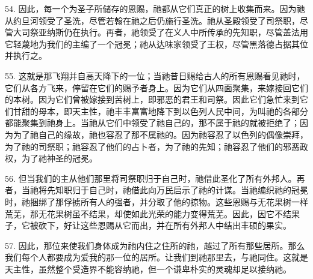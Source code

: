 54. 因此，每一个为圣子所储存的恩赐，祂都从它们真正的树上收集而来。因为祂从约旦河领受了圣洗，尽管若翰在祂之后仍施行圣洗。祂从圣殿领受了司祭职，尽管大司祭亚纳斯仍在执行。再者，祂领受了在义人中所传承的先知职，尽管盖法用它轻蔑地为我们的主编了一个冠冕；祂从达味家领受了王权，尽管黑落德占据其位并执行之。\par

55. 这就是那飞翔并自高天降下的一位；当祂昔日赐给古人的所有恩赐看见祂时，它们从各方飞来，停留在它们的赐予者身上。因为它们从四面聚集，来嫁接回它们的本树。因为它们曾被嫁接到苦树上，即邪恶的君王和司祭。因此它们急忙来到它们甘甜的母本，即天主性，祂丰丰富富地降下到以色列人民中间，为叫祂的各部分都能聚集到祂身上。当祂从它们中领受了祂自己的，那不属于祂的就被拒绝了；因为为了祂自己的缘故，祂也容忍了那不属祂的。因为祂容忍了以色列的偶像崇拜，为了祂的司祭职；祂容忍了他们的占卜者，为了祂的先知；祂容忍了他们的邪恶政权，为了祂神圣的冠冕。\par

56. 但当我们的主从他们那里将司祭职归于自己时，祂借此圣化了所有外邦人。再者，当祂将先知职归于自己时，祂借此向万民启示了祂的计谋。当祂编织祂的冠冕时，祂捆绑了那俘掳所有人的强者，并分取了他的掠物。这些恩赐与无花果树一样荒芜，那无花果树虽不结果，却使如此光荣的能力变得荒芜。因此，因它不结果子，它被砍下，好让这些恩赐从它而出，并在所有外邦人中结出丰硕的果实。\par

57. 因此，那位来使我们身体成为祂内住之住所的祂，越过了所有那些居所。那么我们每个人都要成为爱我的那一位的居所。让我们到祂那里去，与祂同住。这就是天主性，虽然整个受造界不能容纳祂，但一个谦卑朴实的灵魂却足以接纳祂。\par

